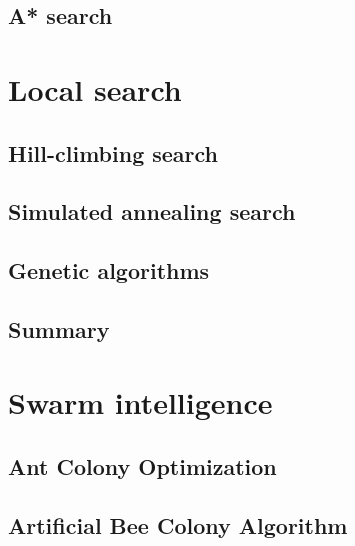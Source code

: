\documentclass[12pt,a4paper,twoside]{book}
\begin{document}
\section{A* search}

\label{s_3_2}

\chapter{Local search}

\label{c_4}

\section{Hill-climbing search}

\label{s_4_1}

\section{Simulated annealing search}

\label{s_4_2}

\section{Genetic algorithms}

\label{s_4_3}

\section{Summary}

\label{s_4_4}

\chapter{Swarm intelligence}

\label{c_5}

\section{Ant Colony Optimization}

\label{s_5_1}

\section{Artificial Bee Colony Algorithm}

\label{s_5_2}
\end{document}
